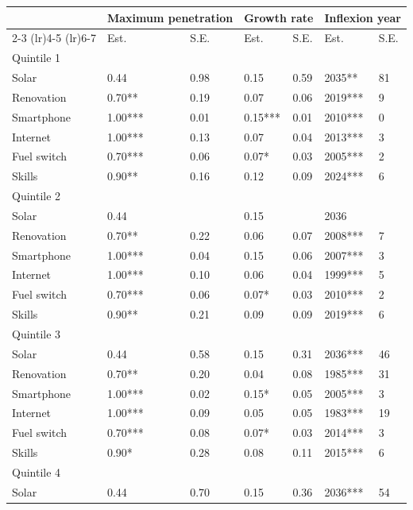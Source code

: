 \begin{tabular}{l{2cm}p{1cm}p{1cm}p{1cm}p{1cm}p{1cm}p{1cm}} \toprule
          & \multicolumn{2}{c}{Maximum penetration} & \multicolumn{2}{c}{Growth rate} & \multicolumn{2}{c}{Inflexion year} \\ 
          \cmidrule(lr){2-3} \cmidrule(lr){4-5} \cmidrule(lr){6-7}
          & Est. & S.E. & Est. & S.E. & Est. & S.E. \\ 
          \midrule 
 Quintile 1& & & & & & \\ \midrule
Solar & 0.44 & 0.98 & 0.15 & 0.59 & 2035** & 81 \\
Renovation & 0.70** & 0.19 & 0.07 & 0.06 & 2019*** & 9 \\
Smartphone & 1.00*** & 0.01 & 0.15*** & 0.01 & 2010*** & 0 \\
Internet & 1.00*** & 0.13 & 0.07 & 0.04 & 2013*** & 3 \\
Fuel switch & 0.70*** & 0.06 & 0.07* & 0.03 & 2005*** & 2 \\
Skills & 0.90** & 0.16 & 0.12 & 0.09 & 2024*** & 6 \\\midrule 
Quintile 2& & & & & & \\ \midrule
Solar & 0.44 &  & 0.15 &  & 2036 &  \\
Renovation & 0.70** & 0.22 & 0.06 & 0.07 & 2008*** & 7 \\
Smartphone & 1.00*** & 0.04 & 0.15 & 0.06 & 2007*** & 3 \\
Internet & 1.00*** & 0.10 & 0.06 & 0.04 & 1999*** & 5 \\
Fuel switch & 0.70*** & 0.06 & 0.07* & 0.03 & 2010*** & 2 \\
Skills & 0.90** & 0.21 & 0.09 & 0.09 & 2019*** & 6 \\\midrule 
Quintile 3& & & & & & \\ \midrule
Solar & 0.44 & 0.58 & 0.15 & 0.31 & 2036*** & 46 \\
Renovation & 0.70** & 0.20 & 0.04 & 0.08 & 1985*** & 31 \\
Smartphone & 1.00*** & 0.02 & 0.15* & 0.05 & 2005*** & 3 \\
Internet & 1.00*** & 0.09 & 0.05 & 0.05 & 1983*** & 19 \\
Fuel switch & 0.70*** & 0.08 & 0.07* & 0.03 & 2014*** & 3 \\
Skills & 0.90* & 0.28 & 0.08 & 0.11 & 2015*** & 6 \\\midrule 
Quintile 4& & & & & & \\ \midrule
Solar & 0.44 & 0.70 & 0.15 & 0.36 & 2036*** & 54 \\

\end{tabular}
